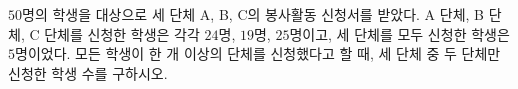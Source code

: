 $50$명의 학생을 대상으로 세 단체 A, B, C의 봉사활동 신청서를 받았다. A 단체, B 단체, C 단체를 신청한 학생은 각각 $24$명, $19$명, $25$명이고, 세 단체를 모두 신청한 학생은 $5$명이었다. 모든 학생이 한 개 이상의 단체를 신청했다고 할 때, 세 단체 중 두 단체만 신청한 학생 수를 구하시오.

